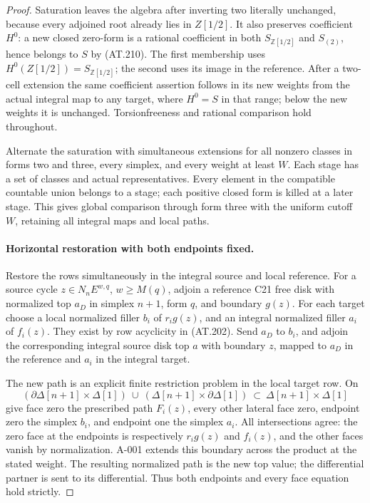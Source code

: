 \begin{proof}
Saturation leaves the algebra after inverting two literally
unchanged, because every adjoined root already lies in $Z[1/2]$.
It also preserves coefficient $H^0$: a new closed zero-form is a
rational coefficient in both $S_{\mathbb Z[1/2]}$ and $S_{(2)}$,
hence belongs to $S$ by \textup{(AT.210)}.
The first membership uses $H^0(Z[1/2])=S_{\mathbb Z[1/2]}$;
the second uses its image in the reference.
After a two-cell extension the same coefficient assertion follows
in its new weights from the actual integral map to any target,
where $H^0=S$ in that range; below the new weights it is unchanged.
Torsionfreeness and rational comparison hold throughout.

Alternate the saturation with simultaneous extensions for all
nonzero classes in forms two and three, every simplex, and every
weight at least $W$. Each stage has a set of classes and actual
representatives. Every element in the compatible countable union
belongs to a stage; each positive closed form is killed at a later
stage. This gives global comparison through form three with the
uniform cutoff $W$, retaining all integral maps and local paths.

\paragraph{Horizontal restoration with both endpoints fixed.}
Restore the rows simultaneously in the integral source and local
reference. For a source cycle $z\in N_nE^{w,q}$, $w\geq M(q)$,
adjoin a reference C21 free disk with normalized top $a_D$ in
simplex $n+1$, form $q$, and boundary $g(z)$.
For each target choose a local normalized filler $b_i$ of
$r_i g(z)$, and an integral normalized filler $a_i$ of $f_i(z)$.
They exist by row acyclicity in \textup{(AT.202)}.
Send $a_D$ to $b_i$, and adjoin the corresponding integral source
disk top $a$ with boundary $z$, mapped to $a_D$ in the reference
and $a_i$ in the integral target.

The new path is an explicit finite restriction problem in the
local target row. On
\[
 (\partial\Delta[n+1]\times\Delta[1])
 \ \cup\ (\Delta[n+1]\times\partial\Delta[1])
 \ \subset\ \Delta[n+1]\times\Delta[1]
\]
give face zero the prescribed path $F_i(z)$, every other lateral
face zero, endpoint zero the simplex $b_i$, and endpoint one the
simplex $a_i$. All intersections agree: the zero face at the
endpoints is respectively $r_i g(z)$ and $f_i(z)$, and the other
faces vanish by normalization.
A-001 extends this boundary across the product at the stated
weight. The resulting normalized path is the new top value;
the differential partner is sent to its differential.
Thus both endpoints and every face equation hold strictly.


\end{proof}
